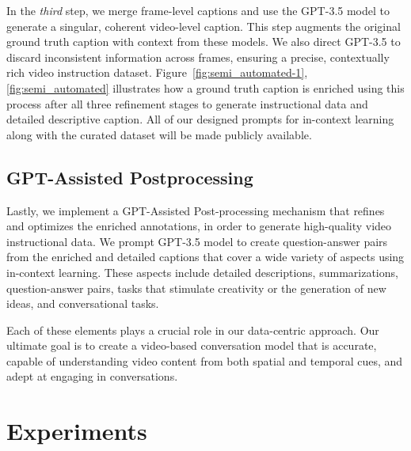 In the \emph{third} step, we merge frame-level captions and use the GPT-3.5 model to generate a singular, coherent video-level caption. This step augments the original ground truth caption with context from these models. We also direct GPT-3.5 to discard inconsistent information across frames, ensuring a precise, contextually rich video instruction dataset. Figure~\ref{fig:semi_automated-1},\ref{fig:semi_automated} illustrates how a ground truth caption is enriched using this process after all three refinement stages to generate instructional data and detailed descriptive caption. All of our designed prompts for in-context learning along with the curated dataset will be made publicly available.

\subsection{GPT-Assisted Postprocessing} 
Lastly, we implement a GPT-Assisted Post-processing mechanism that refines and optimizes the enriched annotations, in order to generate high-quality video instructional data. We prompt GPT-3.5 model to create question-answer pairs from the enriched and detailed captions that cover a wide variety of aspects using in-context learning. These aspects include detailed descriptions, summarizations, question-answer pairs, tasks that stimulate creativity or the generation of new ideas, and conversational tasks.

Each of these elements plays a crucial role in our data-centric approach. Our ultimate goal is to create a video-based conversation model that is accurate, capable of understanding video content from both spatial and temporal cues, and adept at engaging in conversations.

\section{Experiments}

